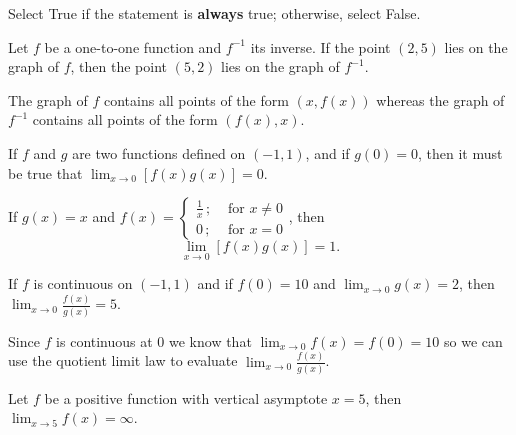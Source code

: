 \documentclass{ximera}
\author{Nela Lakos \and Kyle Parsons \and Bobby Ramsey}
\begin{document}
\begin{exercise}
	Select True if the statement is \textbf{always} true; otherwise, select False.

	Let $f$ be a one-to-one function and $f^{-1}$ its inverse.  If the point $(2,5)$ lies on the graph of $f$, then the point $(5,2)$ lies on the graph of $f^{-1}$.
	\begin{multipleChoice}
	\end{multipleChoice}
	\begin{feedback}
		The graph of $f$ contains all points of the form $\left(x,f(x)\right)$ whereas the graph of $f^{-1}$ contains all points of the form $\left(f(x),x\right)$.
	\end{feedback}

	\begin{exercise}
		If $f$ and $g$ are two functions defined on $\left(-1,1\right)$, and if $g(0) = 0$, then it must be true that $\displaystyle \lim_{x\to0}\left[f(x)g(x)\right]=0$.

		\begin{multipleChoice}
			\choice{True}
			\choice[correct]{False}
		\end{multipleChoice}
		\begin{feedback}
			If $g(x) = x$ and $f(x)=\begin{cases} \frac{1}{x} \,; & \text{ for } x\neq0 \\ 0 \,; & \text{ for } x=0 \end{cases}$, then \[ \lim_{x\to0}\left[f(x)g(x)\right] = 1. \]
		\end{feedback}

		\begin{exercise}
    			If $f$ is continuous on $\left(-1,1\right)$ and if $f(0) = 10$ and $\displaystyle \lim_{x\to0}g(x) = 2$, then $\displaystyle \lim_{x\to0}\frac{f(x)}{g(x)} = 5$.    
	    		\begin{multipleChoice}
    				\choice[correct]{True}
    				\choice{False}
    			\end{multipleChoice}
    
    			\begin{feedback}
    				Since $f$ is continuous at 0 we know that $\displaystyle \lim_{x\to0}f(x) = f(0) = 10$ so we can use the quotient limit law to evaluate $\displaystyle \lim_{x\to0}\frac{f(x)}{g(x)}$.
    			\end{feedback}
    
   	 		\begin{exercise}
    				Let $f$ be a positive function with vertical asymptote $x=5$, then $\displaystyle \lim_{x\to5}f(x) = \infty$.
    				\begin{multipleChoice}
    				\end{multipleChoice}
    

\end{exercise}
\end{exercise}
\end{exercise}
\end{exercise}
\end{document}
